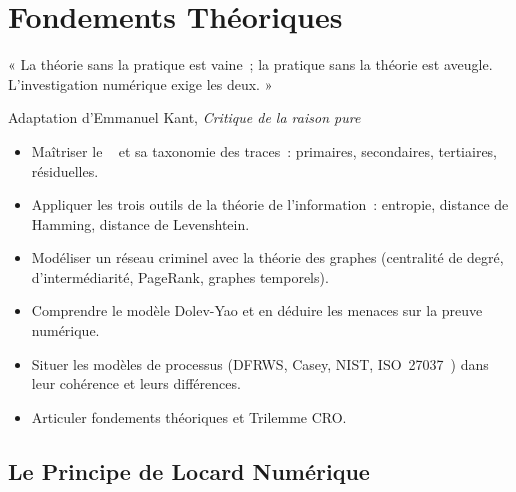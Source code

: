 
\chapter{Fondements Théoriques}
\label{chap:fond-theo}

\epigraph{%
    « La théorie sans la pratique est vaine~; la pratique sans la théorie
    est aveugle. L'investigation numérique exige les deux. »%
}{Adaptation d'Emmanuel Kant, \textit{Critique de la raison pure}}


\begin{boxobjectifs}
\begin{itemize}
    \item Maîtriser le ~\cite{locard1920} et
          sa taxonomie des traces~: primaires, secondaires, tertiaires,
          résiduelles.
    \item Appliquer les trois outils de la théorie de l'information~:
          entropie, distance de Hamming, distance de Levenshtein.
    \item Modéliser un réseau criminel avec la théorie des graphes
          (centralité de degré, d'intermédiarité, PageRank, graphes temporels).
    \item Comprendre le modèle Dolev-Yao et en déduire les menaces
          sur la preuve numérique.
    \item Situer les modèles de processus (DFRWS, Casey, NIST, ISO~27037~\cite{iso27037})
          dans leur cohérence et leurs différences.
    \item Articuler fondements théoriques et Trilemme CRO.
\end{itemize}
\end{boxobjectifs}

\bigskip

\section{Le Principe de Locard Numérique}
\label{sec:locard}

